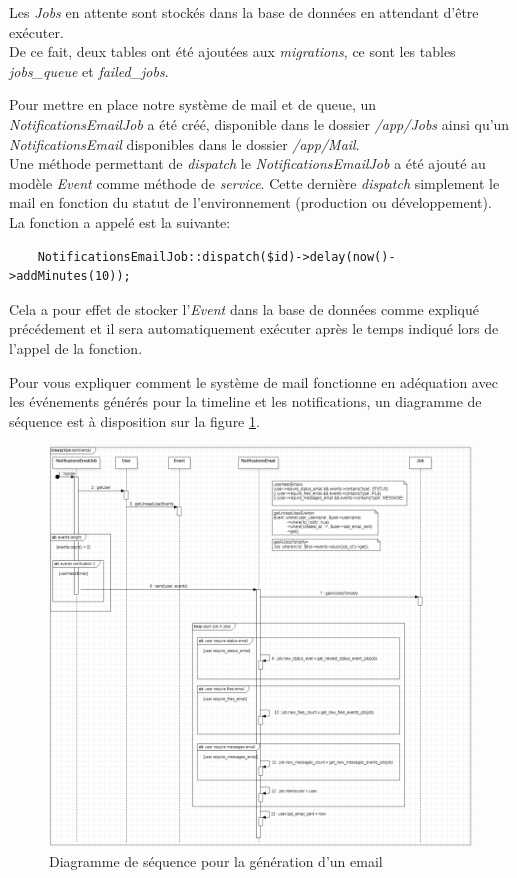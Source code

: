 \documentclass[
    iai, %
    il, %
]{heig-tb}
\begin{document}
Les \emph{Jobs} en attente sont stockés dans la base de données en attendant d'être exécuter. \\
De ce fait, deux tables ont été ajoutées aux \emph{migrations}, ce sont les tables \emph{jobs\_queue} et \emph{failed\_jobs}.

Pour mettre en place notre système de mail et de queue, un \emph{NotificationsEmailJob} a été créé, disponible dans le dossier \emph{/app/Jobs} ainsi qu'un \emph{NotificationsEmail} disponibles dans le dossier \emph{/app/Mail}. \\
Une méthode permettant de \emph{dispatch} le \emph{NotificationsEmailJob} a été ajouté au modèle \emph{Event} comme méthode de \emph{service}. Cette dernière \emph{dispatch} simplement le mail en fonction du statut de l'environnement (production ou développement). \\
La fonction a appelé est la suivante:
\begin{lstlisting}
    NotificationsEmailJob::dispatch($id)->delay(now()->addMinutes(10));
\end{lstlisting}

Cela a pour effet de stocker l'\emph{Event} dans la base de données comme expliqué précédement et il sera automatiquement exécuter après le temps indiqué lors de l'appel de la fonction.

Pour vous expliquer comment le système de mail fonctionne en adéquation avec les événements générés pour la timeline et les notifications, un diagramme de séquence est à disposition sur la figure \ref{events-email-sequence}.

\begin{center}
    \begin{figure}
        \includegraphics[width=\textwidth]{./assets/figures/emails-events-sequence.png}
        \caption{Diagramme de séquence pour la génération d'un email \label{events-email-sequence}}
    \end{figure}
\end{center}
\end{document}
